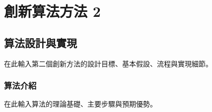\chapter{創新算法方法 2}

\section{算法設計與實現}
在此輸入第二個創新方法的設計目標、基本假設、流程與實現細節。

\subsection{算法介紹}
在此輸入算法的理論基礎、主要步驟與預期優勢。
